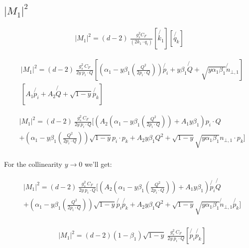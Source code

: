 \subsection*{$ |M_1|^2 $}

\begin{equation}
\begin{split}
|M_1|^2=(d-2)\:\frac{g_s^2  C_F }{(2k_1\cdot q_i)}
[\not{k_1} ][\not{q_k}]
\end{split}
\end{equation}

\begin{equation}
\begin{split}
&|M_1|^2=(d-2)\:\frac{g_s^2 \: C_F }{2y\: p_i \cdot Q}
[(\alpha_1 -y\beta_1(\frac{Q^2}{2p_i \cdot Q})) \not{p_i} + y\beta_1\not{Q} + \sqrt{y\alpha_1\beta_1}\not{n}_{\bot,1} ]\\
&[A_1\not{p_i} + A_2\not{Q} + \sqrt{1-y}\not{p_k}]
\end{split}
\end{equation}

\begin{equation}
\begin{split}
&|M_1|^2=(d-2)\:\frac{g_s^2 \: C_F }{2y\: p_i \cdot Q}
[(A_2(\alpha_1 -y\beta_1(\frac{Q^2}{2p_i \cdot Q}))+ A_1y\beta_1) {p_i}\cdot Q\\
&+(\alpha_1 -y\beta_1(\frac{Q^2}{2p_i \cdot Q}))\sqrt{1-y}p_i\cdot p_k+A_2 y\beta_1 Q^2+ \sqrt{1-y}\sqrt{y\alpha_1\beta_1}{n}_{\bot,1}\cdot p_k ]\\
\end{split}
\end{equation}

For the collinearity $ y \rightarrow 0 $ we'll get:

\begin{equation}
\begin{split}
&|M_1|^2=(d-2)\:\frac{g_s^2 \: C_F }{2y\: p_i \cdot Q}
[(A_2(\alpha_1 -y\beta_1(\frac{Q^2}{2p_i \cdot Q}))+ A_1y\beta_1) \not{p_i} \not{Q}\\
&+(\alpha_1 -y\beta_1(\frac{Q^2}{2p_i \cdot Q}))\sqrt{1-y}\not{p_i} \not{p_k}+A_2 y\beta_1 Q^2+ \sqrt{1-y}\sqrt{y\alpha_1\beta_1}\not{n}_{\bot,1} \not{p_k} ]\\
\end{split}
\end{equation}

\begin{equation}
\begin{split}
&|M_1|^2=(d-2)(1-\beta_1)\sqrt{1-y}\:\frac{g_s^2 \: C_F }{2y\: p_i \cdot Q}
[\not{p_i} \not{p_k} ]\\
\end{split}
\end{equation}

